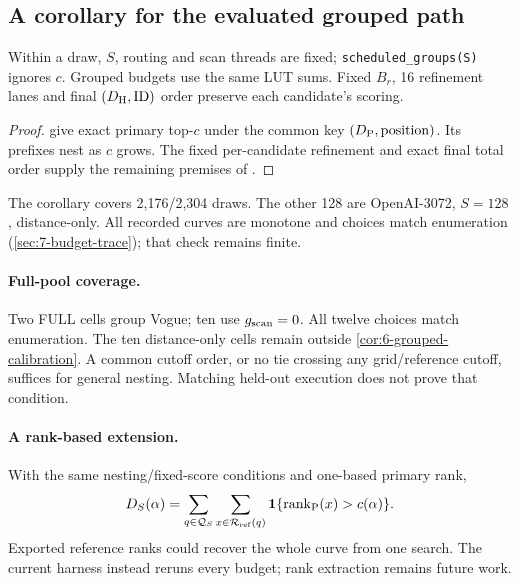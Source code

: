 \subsection{A corollary for the evaluated grouped path}

Within a draw, $S$, routing and scan threads are fixed; \texttt{scheduled\_groups(S)} ignores $c$. Grouped budgets use the same LUT sums. Fixed $B_r$, 16 refinement lanes and final $(D_{\mathrm{H}},\mathrm{ID})$ order preserve each candidate's scoring.

\par\noindent\begin{minipage}{\linewidth}
\begin{proof}
 give exact
primary top-$c$ under the common key $(D_{\mathrm{P}},\mathrm{position})$.
Its prefixes nest as $c$ grows. The fixed per-candidate refinement and
exact final total order supply the remaining premises of
.
\end{proof}
\end{minipage}\par\medskip

The corollary covers 2,176/2,304 draws. The other 128 are OpenAI-3072, $S=128$, distance-only. All recorded curves are monotone and choices match enumeration (\cref{sec:7-budget-trace}); that check remains finite.

\paragraph{Full-pool coverage.}
Two FULL cells group Vogue; ten use $g_{\mathrm{scan}}=0$. All twelve choices match enumeration. The ten distance-only cells remain outside \cref{cor:6-grouped-calibration}. A common cutoff order, or no tie crossing any grid/reference cutoff, suffices for general nesting. Matching held-out execution does not prove that condition.

\paragraph{A rank-based extension.}
With the same nesting/fixed-score conditions and one-based primary rank,
\begin{equation}
 D_S(\alpha)=\sum_{q\in\mathcal Q_S}\sum_{x\in\mathcal R_{\rm ref}(q)}
 \mathbf1\{\operatorname{rank}_{\rm P}(x)>c(\alpha)\}.
 \label{eq:6-rank-curve}
\end{equation}
Exported reference ranks could recover the whole curve from one search. The current harness instead reruns every budget; rank extraction remains future work.